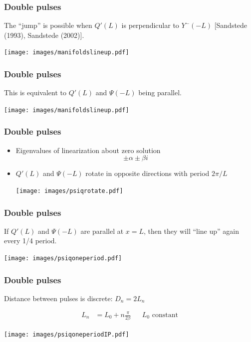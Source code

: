 \documentclass[16pt]{beamer}
\begin{document}
\begin{frame}
	\frametitle{Double pulses}
	\fontsize{16}{7.2}\selectfont

	The ``jump'' is possible when $Q'(L)$ is perpendicular to $Y^-(-L)$ \footnotesize [Sandstede (1993), Sandstede (2002)].

	\begin{center}
		\texttt{[image: images/manifoldslineup.pdf]}
	\end{center}
\end{frame}

\begin{frame}
	\frametitle{Double pulses}
	\fontsize{16}{7.2}\selectfont

	This is equivalent to $Q'(L)$ and $\Psi(-L)$ being parallel.

	\begin{center}
		\texttt{[image: images/manifoldslineup.pdf]}
	\end{center}
\end{frame}

\begin{frame}
	\frametitle{Double pulses}
	\fontsize{16}{7.2}\selectfont

	\begin{itemize}
		\item Eigenvalues of linearization about zero solution
		\[\pm \alpha \pm \beta i \]
		\item $Q'(L)$ and $\Psi(-L)$ rotate in opposite directions with period $2 \pi/L$

		\begin{center}
			\texttt{[image: images/psiqrotate.pdf]}
		\end{center}
	\end{itemize}

\end{frame}

\begin{frame}
	\frametitle{Double pulses}
	\fontsize{16}{7.2}\selectfont
	If $Q'(L)$ and $\Psi(-L)$ are parallel at $x = L$, then they will ``line up'' again every 1/4 period.
	
	\begin{center}
		\texttt{[image: images/psiqoneperiod.pdf]}
	\end{center}

\end{frame}

\begin{frame}
	\frametitle{Double pulses}
	\fontsize{16}{7.2}\selectfont
	Distance between pulses is discrete: $D_n = 2 L_n$

	\begin{align*}
	L_n &= L_0 + n \frac{\pi}{ 2 \beta } && L_0 \text{ constant}
	\end{align*}
	
	\begin{center}
		\texttt{[image: images/psiqoneperiodIP.pdf]}
	\end{center}

\end{frame}
\end{document}
